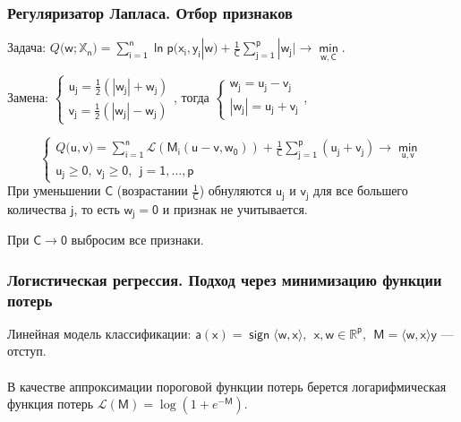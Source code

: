 \documentclass[unicode, notheorems]{beamer}
\newtheorem{task}{Задача}
\DeclareMathOperator{\sign}{sign}
\begin{document}
\begin{frame}
	\frametitle{Регуляризатор Лапласа. Отбор признаков}
Задача: $Q(\mathsf{w;\mathbb{X}_n)=\sum\limits_{i=1}^n \ln p(x_i,y_i|w)+\frac{1}{C}\sum\limits_{j=1}^p|w_j| \to \min\limits_{w,C}}$.

Замена: $\begin{cases} \mathsf{u_j=\frac{1}{2}(|w_j|+w_j)} \\ \mathsf{v_j=\frac{1}{2}(|w_j|-w_j)} \end{cases}$, тогда $\begin{cases} \mathsf{w_j=u_j-v_j} \\ \mathsf{|w_j|=u_j+v_j} \end{cases}$,

\begin{equation*}
\begin{cases}
Q(\mathsf{u,v)=\sum \limits_{i=1}^n \mathcal{L}(M_i(u-v,w_0))+\frac{1}{C}\sum\limits_{j=1}^p (u_j+v_j) \to \min\limits_{u,v}} \\
\mathsf{u_j\ge 0,~v_j\ge 0,~~ j=1,\ldots,p}
\end{cases}
\end{equation*}
При уменьшении $\mathsf{C}$ (возрастании $\mathsf{\frac{1}{C}}$) обнуляются $\mathsf{u_j}$ и $\mathsf{v_j}$ для все большего количества $\mathsf{j}$, то есть $\mathsf{w_j=0}$ и признак не учитывается. 

При $\mathsf{C\to 0}$ выбросим все признаки.
\end{frame}

\begin{frame}
\frametitle{Логистическая регрессия. Подход через минимизацию функции потерь}
Линейная модель классификации: $\mathsf{a(x)=\sign \langle w,x\rangle,~~ x,w\in \mathbb{R}^p,~~ M=\langle w,x \rangle y}$ --- отступ. \\
~~\\

В качестве аппроксимации пороговой функции потерь берется логарифмическая функция потерь $\mathcal{L}(\mathsf{M})=\log(1+e^{-\mathsf{M}}).$ \\

\begin{figure}[h]
	\begin{minipage}[h]{0.6\linewidth}
	\end{minipage}
	\label{ris:image1}
\end{figure}
\end{frame}
\end{document}
